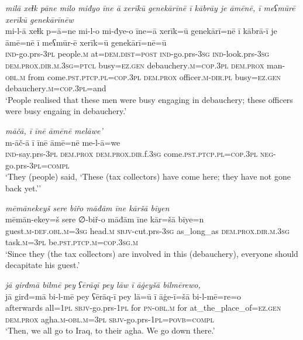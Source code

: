 \ea \label{BP.45}
\textit{milā xeɫk pāne milo miđyo īne ā xerīkū genekārīnē ī kābrāy je āmēnē, ī meʕmūrē xerīkū genekārīnēw} \\ 
\gll mi-l-ā xeɫk p=ā=ne mi-l-o mi-đye-o īne=ā xerīk=ū genekārī=nē ī kābrā-ī je āmē=nē ī meʕmūr-ē xerīk=ū genekārī=nē=ū \\ 
 \textsc{ind-}go.prs\textsc{-3pl} people\textsc{.m} at=\textsc{dem.dist}\textsc{=\textsc{post}} \textsc{ind-}go.prs\textsc{-3sg} \textsc{ind-}look.prs\textsc{-3sg} \textsc{dem.prox}\textsc{.dir}\textsc{.m}\textsc{.3sg}=\textsc{ptcl} busy\textsc{=ez.gen} debauchery\textsc{.m}\textsc{=cop}\textsc{.3pl} \textsc{dem.prox} man\textsc{-obl}\textsc{.m} from come\textsc{.pst}\textsc{.ptcp}\textsc{.pl}\textsc{=cop}\textsc{.3pl} \textsc{dem.prox} officer\textsc{.m}\textsc{-dir}\textsc{.pl} busy\textsc{=ez.gen} debauchery\textsc{.m}\textsc{=cop}\textsc{.3pl}=and \\ 
\glt `People realised that these men were busy engaging in debauchery; these officers were busy engaing in debauchery.'
\z 
 
\ea \label{BP.47}
\textit{māčā, ī īnē āmēnē melāwe’} \\ 
\gll m-āč-ā ī īnē āmē=nē me-l-ā=we \\ 
 \textsc{ind-}say.prs\textsc{-3pl} \textsc{dem.prox} \textsc{dem.prox}\textsc{.dir}.f\textsc{.3sg} come\textsc{.pst}\textsc{.ptcp}\textsc{.pl}\textsc{=cop}\textsc{.3pl} \textsc{neg-}go.prs\textsc{-3pl}\textsc{=compl} \\ 
\glt `They (people) said, ‘These (tax collectors) have come here; they have not gone back yet.’'
\z 
 
\ea \label{BP.53}
\textit{mēmānekeyš sere biřo māđām īne kāršā bīyen} \\ 
\gll mēmān-ekey=š sere ∅-biř-o māđām īne kār=šā bīye=n \\ 
 guest\textsc{.m}\textsc{-def}\textsc{.obl}\textsc{.m}\textsc{=3sg} head\textsc{.m} \textsc{sbjv-}cut.prs\textsc{-3sg} as\_long\_as \textsc{dem.prox}\textsc{.dir}\textsc{.m}\textsc{.3sg} task\textsc{.m}\textsc{=3pl} be\textsc{.pst}\textsc{.ptcp}\textsc{.m}\textsc{=cop}\textsc{.3sg}\textsc{.m} \\ 
\glt `Since they (the tax collectors) are involved in this (debauchery), everyone should decapitate his guest.'
\z 
 
\ea \label{BP.56}
\textit{jā girđmā bilmē pey ʕērāqī pey lāw ī āġeyšā bilmērewo,} \\ 
\gll jā girđ=mā bi-l-mē pey ʕērāq-ī pey lā=ū ī āġe-ī=šā bi-l-mē=re=o \\ 
 afterwards all\textsc{=\textsc{1pl}} \textsc{sbjv-}go.prs\textsc{-\textsc{1pl}} for \textsc{pn}\textsc{-obl}\textsc{.m} for at\_the\_place\_of\textsc{=ez.gen} \textsc{dem.prox} agha\textsc{.m}\textsc{-obl}\textsc{.m}\textsc{=3pl} \textsc{sbjv-}go.prs\textsc{-\textsc{1pl}}\textsc{=\textsc{povb}}\textsc{=compl} \\ 
\glt `Then, we all go to Iraq, to their agha. We go down there.'
\z 
 
